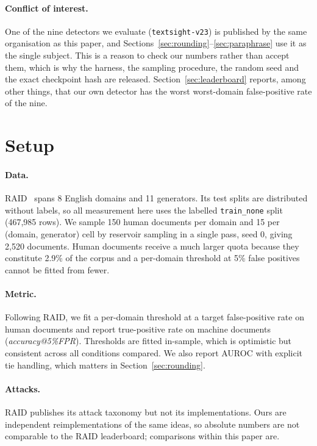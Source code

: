 \documentclass[11pt]{article}
\begin{document}
\paragraph{Conflict of interest.} One of the nine detectors we evaluate
(\texttt{textsight-v23}) is published by the same organisation as this paper, and
Sections~\ref{sec:rounding}--\ref{sec:paraphrase} use it as the single subject.
This is a reason to check our numbers rather than accept them, which is why the
harness, the sampling procedure, the random seed and the exact checkpoint hash
are released. Section~\ref{sec:leaderboard} reports, among other things, that our
own detector has the worst worst-domain false-positive rate of the nine.

\section{Setup}

\paragraph{Data.} RAID~\cite{raid} spans 8 English domains and 11 generators.
Its test splits are distributed without labels, so all measurement here uses the
labelled \texttt{train\_none} split (467{,}985 rows). We sample 150 human
documents per domain and 15 per (domain, generator) cell by reservoir sampling in
a single pass, seed 0, giving 2{,}520 documents. Human documents receive a much
larger quota because they constitute 2.9\% of the corpus and a per-domain
threshold at 5\% false positives cannot be fitted from fewer.

\paragraph{Metric.} Following RAID, we fit a per-domain threshold at a target
false-positive rate on human documents and report true-positive rate on machine
documents (\emph{accuracy@5\%FPR}). Thresholds are fitted in-sample, which is
optimistic but consistent across all conditions compared. We also report AUROC
with explicit tie handling, which matters in Section~\ref{sec:rounding}.

\paragraph{Attacks.} RAID publishes its attack taxonomy but not its
implementations. Ours are independent reimplementations of the same ideas, so
absolute numbers are not comparable to the RAID leaderboard; comparisons within
this paper are.
\end{document}
